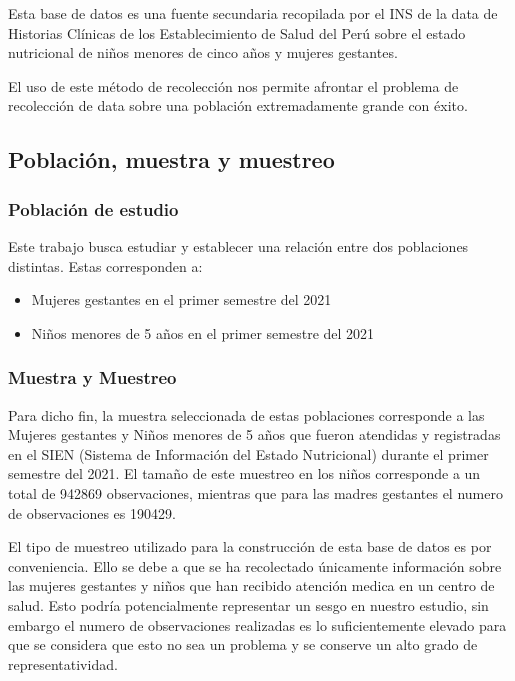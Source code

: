 \documentclass[
]{article}
\providecommand{\tightlist}{%
  \setlength{\itemsep}{0pt}\setlength{\parskip}{0pt}}
\begin{document}
Esta base de datos es una fuente secundaria recopilada por el INS de la
data de Historias Clínicas de los Establecimiento de Salud del Perú
sobre el estado nutricional de niños menores de cinco años y mujeres
gestantes.

El uso de este método de recolección nos permite afrontar el problema de
recolección de data sobre una población extremadamente grande con éxito.

\hypertarget{poblaciuxf3n-muestra-y-muestreo}{%
\subsection{Población, muestra y
muestreo}\label{poblaciuxf3n-muestra-y-muestreo}}

\hypertarget{poblaciuxf3n-de-estudio}{%
\subsubsection{Población de estudio}\label{poblaciuxf3n-de-estudio}}

Este trabajo busca estudiar y establecer una relación entre dos
poblaciones distintas. Estas corresponden a:

\begin{itemize}
\tightlist
\item
  Mujeres gestantes en el primer semestre del 2021
\item
  Niños menores de 5 años en el primer semestre del 2021
\end{itemize}

\hypertarget{muestra-y-muestreo}{%
\subsubsection{Muestra y Muestreo}\label{muestra-y-muestreo}}

Para dicho fin, la muestra seleccionada de estas poblaciones corresponde
a las Mujeres gestantes y Niños menores de 5 años que fueron atendidas y
registradas en el SIEN (Sistema de Información del Estado Nutricional)
durante el primer semestre del 2021. El tamaño de este muestreo en los
niños corresponde a un total de 942869 observaciones, mientras que para
las madres gestantes el numero de observaciones es 190429.

El tipo de muestreo utilizado para la construcción de esta base de datos
es por conveniencia. Ello se debe a que se ha recolectado únicamente
información sobre las mujeres gestantes y niños que han recibido
atención medica en un centro de salud. Esto podría potencialmente
representar un sesgo en nuestro estudio, sin embargo el numero de
observaciones realizadas es lo suficientemente elevado para que se
considera que esto no sea un problema y se conserve un alto grado de
representatividad.
\end{document}
